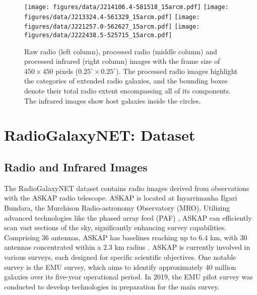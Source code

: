 \documentclass[
  journal=pasa,
  manuscript=research-paper, %
  year=2020,
  volume=37,
]{cup-journal}
\begin{document}
\begin{figure*}
\centering
\texttt{[image: figures/data/J214106.4-581518\_15arcm.pdf]}
\texttt{[image: figures/data/J213324.4-561329\_15arcm.pdf]}
\texttt{[image: figures/data/J221257.0-562627\_15arcm.pdf]}
\texttt{[image: figures/data/J222438.5-525715\_15arcm.pdf]}
\caption{Raw radio (left column), processed radio (middle column) and processed infrared (right column) images with the frame size of $450\times450$ pixels ($0.25^{\circ}\times 0.25^{\circ}$). The processed radio images highlight the categories of extended radio galaxies, and the bounding boxes denote their total radio extent encompassing all of its components. The infrared images show host galaxies inside the circles.} 
\label{FIG:RadioGalaxies15arcm}
\end{figure*}

\section{RadioGalaxyNET: Dataset}
\label{SEC:dataset}
\subsection{Radio and Infrared Images}
The RadioGalaxyNET dataset contains radio images derived from observations with the ASKAP radio telescope. 
ASKAP is located at Inyarrimanha Ilgari Bundara, the Murchison Radio-astronomy Observatory (MRO). Utilizing advanced technologies like the phased array feed (PAF) \citep[PAF][]{hay06}, ASKAP can efficiently scan vast sections of the sky, significantly enhancing survey capabilities. Comprising 36 antennas, ASKAP has baselines reaching up to 6.4 km, with 30 antennas concentrated within a 2.3 km radius \citep{hotan21}. ASKAP is currently involved in various surveys, each designed for specific scientific objectives. One notable survey is the EMU survey, which aims to identify approximately 40 million galaxies over its five-year operational period. In 2019, the EMU pilot survey was conducted to develop technologies in preparation for the main survey.

\end{document}
